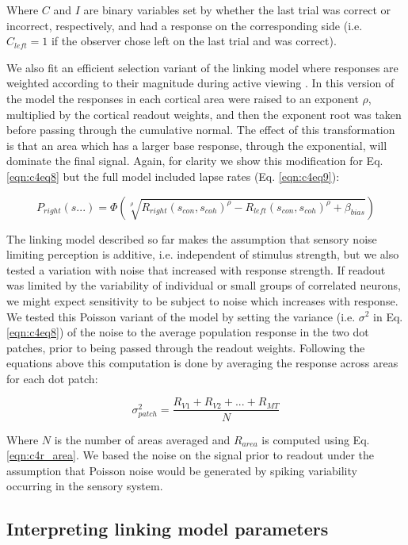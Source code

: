 Where $C$ and $I$ are binary variables set by whether the last trial was correct or incorrect, respectively, and had a response on the corresponding side (i.e. $C_{left}=1$ if the observer chose left on the last trial and was correct).  

We also fit an efficient selection variant of the linking model where responses are weighted according to their magnitude during active viewing \citep{Hara2014-mv,Pestilli2011-gi}. In this version of the model the responses in each cortical area were raised to an exponent $\rho$, multiplied by the cortical readout weights, and then the exponent root was taken before passing through the cumulative normal. The effect of this transformation is that an area which has a larger base response, through the exponential, will dominate the final signal. Again, for clarity we show this modification for Eq. \ref{eqn:c4eq8} but the full model included lapse rates (Eq. \ref{eqn:c4eq9}):

\begin{equation}
    P_{right}(s...)=\Phi(\sqrt[\rho]{R_{right}(s_{con},s_{coh})^{\rho}-R_{left}(s_{con},s_{coh})^{\rho}+\beta_{bias}})
\end{equation}

The linking model described so far makes the assumption that sensory noise limiting perception is additive, i.e. independent of stimulus strength, but we also tested a variation with noise that increased with response strength. If readout was limited by the variability of individual or small groups of correlated neurons, we might expect sensitivity to be subject to noise which increases with response. We tested this Poisson variant of the model by setting the variance (i.e. $\sigma^2$ in Eq. \ref{eqn:c4eq8}) of the noise to the average population response in the two dot patches, prior to being passed through the readout weights. Following the equations above this computation is done by averaging the response across areas for each dot patch:

\begin{equation}
    \sigma_{patch}^2=\frac{R_{V1}+R_{V2}+...+R_{MT}}{N}
\end{equation}

Where $N$ is the number of areas averaged and $R_{area}$ is computed using Eq. \ref{eqn:c4r_area}. We based the noise on the signal prior to readout under the assumption that Poisson noise would be generated by spiking variability occurring in the sensory system.

\subsection{Interpreting linking model parameters}

